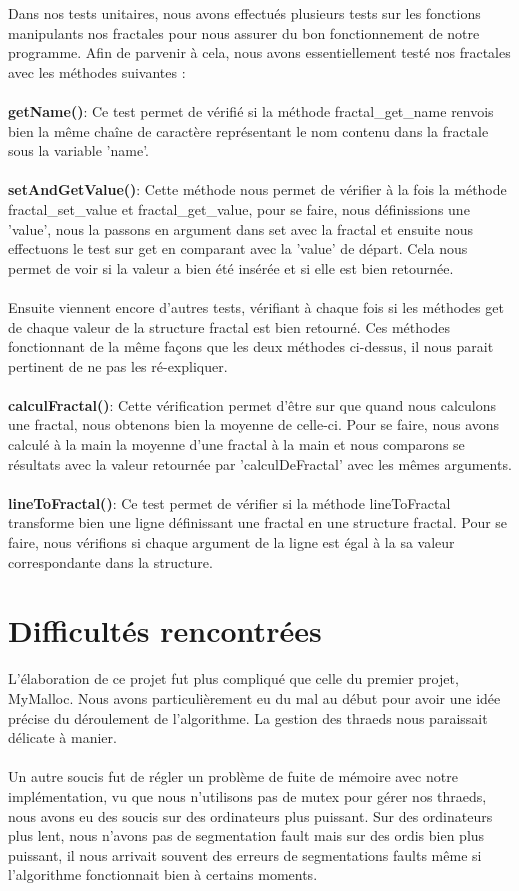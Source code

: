 \documentclass{article}
\begin{document}
Dans nos tests unitaires, nous avons effectués plusieurs tests sur les fonctions manipulants nos fractales pour nous assurer du bon fonctionnement de notre programme. Afin de parvenir à cela, nous avons essentiellement testé nos fractales avec les méthodes suivantes :
\\
\\
\textbf{getName()}: Ce test permet de vérifié si la méthode fractal\_get\_name renvois bien la même chaîne de caractère représentant le nom contenu dans la fractale sous la variable 'name'.
\\
\\
\textbf{setAndGetValue()}: Cette méthode nous permet de vérifier à la fois la méthode fractal\_set\_value et fractal\_get\_value, 
pour se faire, nous définissions une 'value', nous la passons en argument dans set avec la fractal et ensuite nous effectuons le test sur get en comparant avec la 'value' de départ. Cela nous permet de voir si la valeur a bien été insérée et si elle est bien retournée.
\\
\\
Ensuite viennent encore d'autres tests, vérifiant à chaque fois si les méthodes get de chaque valeur de la structure fractal est bien retourné. Ces méthodes fonctionnant de la même façons que les deux méthodes ci-dessus, il nous parait pertinent de ne pas les ré-expliquer.
\\
\\
\textbf{calculFractal()}: Cette vérification permet d'être sur que quand nous calculons une fractal, nous obtenons bien la moyenne de celle-ci. Pour se faire, nous avons calculé à la main la moyenne d'une fractal à la main et nous comparons se résultats avec la valeur retournée par 'calculDeFractal' avec les mêmes arguments.
\\
\\
\textbf{lineToFractal()}: Ce test permet de vérifier si la méthode lineToFractal transforme bien une ligne définissant une fractal en une structure fractal. Pour se faire, nous vérifions si chaque argument de la ligne est égal à la sa valeur correspondante dans la structure.

\section{Difficultés rencontrées}
L'élaboration de ce projet fut plus compliqué que celle du premier projet, MyMalloc. Nous avons particulièrement eu du mal au début pour avoir une idée précise du déroulement de l'algorithme. La gestion des thraeds nous paraissait délicate à manier. 
\\
\\
Un autre soucis fut de régler un problème de fuite de mémoire avec notre implémentation, vu que nous n'utilisons pas de mutex pour gérer nos thraeds, nous avons eu des soucis sur des ordinateurs plus puissant. Sur des ordinateurs plus lent, nous n'avons pas de segmentation fault mais sur des ordis bien plus puissant, il nous arrivait souvent des erreurs de segmentations faults même si l'algorithme fonctionnait bien à certains moments.
\end{document}
